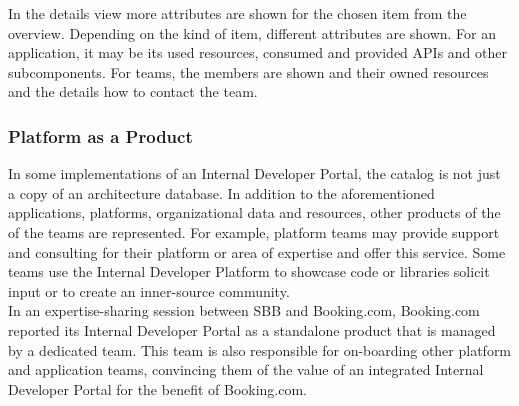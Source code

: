\documentclass[a4paper,12pt]{article}
\begin{document}
    In the details view more attributes are shown for the chosen item from the overview.
    Depending on the kind of item, different attributes are shown.
    For an application, it may be its used resources, consumed and provided APIs and other subcomponents.
    For teams, the members are shown and their owned resources and the details how to contact the team.

    \subsubsection{Platform as a Product}
    \label{sssec:paap}
    In some implementations of an Internal Developer Portal, the catalog is not just a copy of an architecture database.
    In addition to the aforementioned applications, platforms, organizational data and resources, other products of the
    of the teams are represented.
    For example, platform teams may provide support and consulting for their platform or area of expertise and offer
    this service.
    Some teams use the Internal Developer Platform to showcase code or libraries solicit input or to create an
    inner-source community.\\
    In an expertise-sharing session between SBB and Booking.com, Booking.com reported\parencite{bookingcom} its Internal
    Developer Portal as a standalone product that is managed by a dedicated team.
    This team is also responsible for on-boarding other platform and application teams, convincing them of the
    value of an integrated Internal Developer Portal for the benefit of Booking.com.
\end{document}
